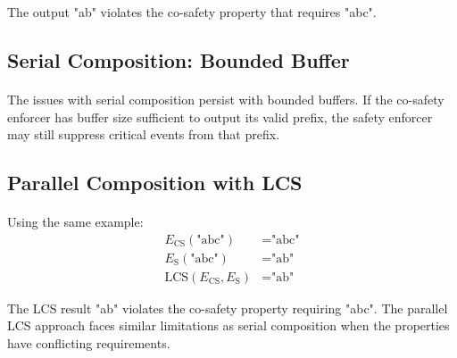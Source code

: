 The output "ab" violates the co-safety property that requires "abc".

\subsection{Serial Composition: Bounded Buffer}
\paragraph{}
The issues with serial composition persist with bounded buffers. If the co-safety enforcer has buffer size sufficient to output its valid prefix, the safety enforcer may still suppress critical events from that prefix.

\subsection{Parallel Composition with LCS}

\paragraph{}
Using the same example:
\begin{align*}
    E_{\text{CS}}(\text{"abc"}) &= \text{"abc"} \\
    E_{\text{S}}(\text{"abc"}) &= \text{"ab"} \\
    \text{LCS}(E_{\text{CS}}, E_{\text{S}}) &= \text{"ab"}
\end{align*}

The LCS result "ab" violates the co-safety property requiring "abc". The parallel LCS approach faces similar limitations as serial composition when the properties have conflicting requirements.

